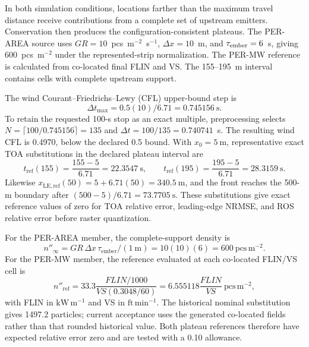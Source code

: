 In both simulation conditions, locations farther than the maximum travel distance receive
contributions from a complete set of upstream emitters. Conservation then produces
the configuration-consistent plateaus. The PER-AREA source uses
$GR=10$~pcs~m$^{-2}$~s$^{-1}$, $\Delta x=10$~m, and
$\tau_{\rm ember}=6$~s, giving 600~pcs~m$^{-2}$ under the represented-strip
normalization. The PER-MW reference is calculated from co-located final FLIN
and VS. The 155--195~m interval contains cells with complete upstream support.

The wind Courant--Friedrichs--Lewy (CFL) upper-bound step is
\[
 \Delta t_{\max}=0.5(10)/6.71=0.745156~\mathrm{s}.
\]
To retain the requested 100-s stop as an exact multiple, preprocessing selects \(N=\lceil100/0.745156\rceil=135\) and \(\Delta t=100/135=0.740741\)~s. The resulting wind CFL is 0.4970, below the declared 0.5 bound.
With \(x_0=5~\mathrm{m}\), representative exact TOA substitutions in the
declared plateau interval are
\[
 t_{\mathrm{ref}}(155)=\frac{155-5}{6.71}=22.3547~\mathrm{s},\qquad
 t_{\mathrm{ref}}(195)=\frac{195-5}{6.71}=28.3159~\mathrm{s}.
\]
Likewise \(x_{\mathrm{LE,ref}}(50)=5+6.71(50)=340.5~\mathrm{m}\), and the
front reaches the 500-m boundary after
\((500-5)/6.71=73.7705~\mathrm{s}\).  These substitutions give exact
reference values of zero for TOA relative error, leading-edge NRMSE, and ROS
relative error before raster quantization.

For the PER-AREA member, the complete-support density is
\[
 n''_{\infty}=GR\,\Delta x\,\tau_{\mathrm{ember}}/(1~\mathrm{m})
 =10(10)(6)=600~\mathrm{pcs\,m^{-2}}.
\]
For the PER-MW member, the reference evaluated at each co-located FLIN/VS
cell is
\[
 n''_{\mathrm{ref}}
 =33.3\frac{FLIN/1000}{VS(0.3048/60)}
 =6.555118\frac{FLIN}{VS}~\mathrm{pcs\,m^{-2}},
\]
with FLIN in \(\mathrm{kW\,m^{-1}}\) and VS in
\(\mathrm{ft\,min^{-1}}\).  The historical nominal substitution gives
1497.2 particles; current acceptance uses the generated co-located fields
rather than that rounded historical value.  Both plateau references therefore
have expected relative error zero and are tested with a 0.10 allowance.

